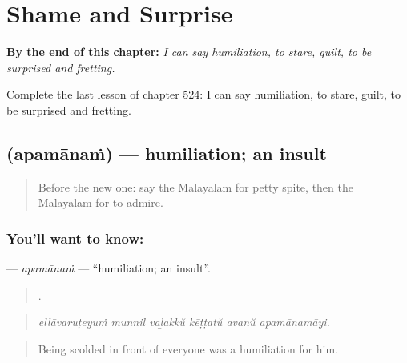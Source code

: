 
\chapter{Shame and Surprise}
\label{ch:ml-shame-and-surprise}

\begin{chapteropening}
\textbf{By the end of this chapter:} \emph{I can say humiliation, to stare, guilt, to be surprised and fretting.}

Complete the last lesson of chapter 524: I can say humiliation, to stare, guilt, to be surprised and fretting.
\end{chapteropening}

\section[\texorpdfstring{\ml{അപമാനം} (apamānaṁ)}{അപമാനം (apamānaṁ)}]{ (apamānaṁ) — humiliation; an insult}

\label{lesson:ML-C524-apamanam}



\begin{quote}
Before the new one: say the Malayalam for petty spite, then the Malayalam for to admire.
\end{quote}

\subsection*{You'll want to know: }
\textbf{} — \emph{apamānaṁ} — \textquotedblleft{}humiliation; an insult\textquotedblright{}.

\begin{quote}
     .
\end{quote}

\begin{quote}
\emph{ellāvaruṭeyuṁ munnil vaḻakkŭ kēṭṭatŭ avanŭ apamānamāyi.}
\end{quote}

\begin{quote}
Being scolded in front of everyone was a humiliation for him.
\end{quote}

